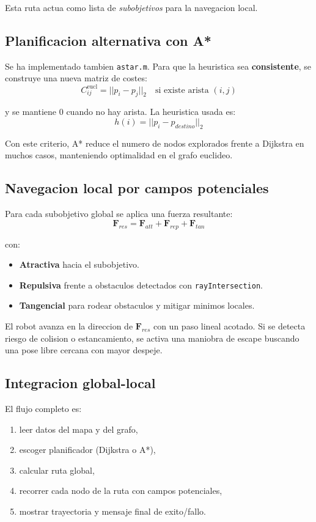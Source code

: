 \documentclass[12pt]{article}
\begin{document}
Esta ruta actua como lista de \emph{subobjetivos} para la navegacion local.

\subsection{Planificacion alternativa con A*}
Se ha implementado tambien \texttt{astar.m}. Para que la heuristica sea \textbf{consistente}, se construye una nueva matriz de costes:
\begin{equation}
C_{ij}^{\mathrm{eucl}} = ||p_i - p_j||_2 \quad \text{si existe arista }(i,j)
\end{equation}

y se mantiene $0$ cuando no hay arista. La heuristica usada es:
\begin{equation}
h(i) = ||p_i - p_{destino}||_2
\end{equation}

Con este criterio, A* reduce el numero de nodos explorados frente a Dijkstra en muchos casos, manteniendo optimalidad en el grafo euclideo.

\subsection{Navegacion local por campos potenciales}
Para cada subobjetivo global se aplica una fuerza resultante:
\begin{equation}
\mathbf{F}_{res} = \mathbf{F}_{att} + \mathbf{F}_{rep} + \mathbf{F}_{tan}
\end{equation}

con:
\begin{itemize}[leftmargin=2em]
  \item \textbf{Atractiva} hacia el subobjetivo.
  \item \textbf{Repulsiva} frente a obstaculos detectados con \texttt{rayIntersection}.
  \item \textbf{Tangencial} para rodear obstaculos y mitigar minimos locales.
\end{itemize}

El robot avanza en la direccion de $\mathbf{F}_{res}$ con un paso lineal acotado. Si se detecta riesgo de colision o estancamiento, se activa una maniobra de escape buscando una pose libre cercana con mayor despeje.

\subsection{Integracion global-local}
El flujo completo es:
\begin{enumerate}[leftmargin=2em]
  \item leer datos del mapa y del grafo,
  \item escoger planificador (Dijkstra o A*),
  \item calcular ruta global,
  \item recorrer cada nodo de la ruta con campos potenciales,
  \item mostrar trayectoria y mensaje final de exito/fallo.
\end{enumerate}
\end{document}

